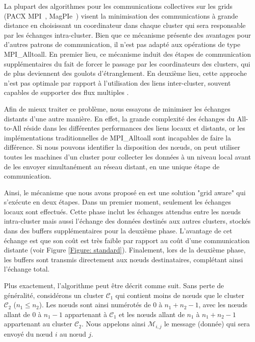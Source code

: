 La plupart des algorithmes pour les communications collectives sur les grids (PACX MPI~\cite{Gabriel98}, MagPIe~\cite{Kielmann01}) visent la minimisation des communications à grande distance en choisissant un coordinateur dans chaque cluster qui sera responsable par les échanges intra-cluster. Bien que ce mécanisme présente des avantages pour d'autres patrons de communication, il n'est pas adapté aux opérations de type  MPI\_Alltoall. En premier lieu, ce mécanisme  induit des étapes de communication supplémentaires du fait de forcer le passage par les coordinateurs des clusters, qui de plus deviennent des goulots d'étranglement. En deuxième lieu, cette approche n'est pas optimale par rapport à l'utilisation des liens inter-cluster, souvent capables de supporter des flux multiples \cite{Casanova05}. 

Afin de mieux traiter ce problème, nous essayons de minimiser les échanges distants d'une autre manière. En effet, la grande complexité des échanges du All-to-All réside dans les différentes performances des liens locaux et distants, or les implémentations traditionnelles de MPI\_Alltoall sont incapables de faire la différence. Si nous pouvons identifier la disposition des n{\oe}uds, on peut utiliser toutes les machines d'un cluster pour collecter les données à un niveau local avant de les envoyer simultanément au réseau distant, en une unique étape de communication. 

Ainsi, le mécanisme que nous avons proposé en \cite{Steffenel07c} est une solution "grid aware" qui s'exécute en deux étapes. Dans un premier moment, seulement les échanges locaux sont effectués. Cette phase inclut les échanges attendus entre les n{\oe}uds intra-cluster mais aussi l'échange des données destinés aux autres clusters, stockés dans des buffers supplémentaires pour la deuxième phase. L'avantage de cet échange est que son coût est très faible par rapport au coût d'une communication distante (voir Figure \ref{Figure: standard}). Finalement, lors de la deuxième phase, les buffers sont transmis directement aux n{\oe}uds destinataires, complétant ainsi l'échange total.  

Plus exactement, l'algorithme peut être décrit comme suit. Sans perte de généralité, considérons un cluster  ${\mathcal C}_1$ qui contient moins de n{\oe}uds que le cluster ${\mathcal C}_2$ ($n_1\leq n_2$). Les n{\oe}uds sont ainsi numérotés de 0 à $n_1+n_2-1$, avec les n{\oe}uds allant de 0 à $n_1-1$ appartenant à ${\mathcal C}_1$ et les n{\oe}uds allant de $n_1$ à $n_1+n_2-1$ appartenant au cluster ${\mathcal C}_2$. Nous appelons ainsi ${\mathcal M}_{i,j}$ le message (donnée) qui sera envoyé du n{\oe}ud $i$ au n{\oe}ud $j$. 

